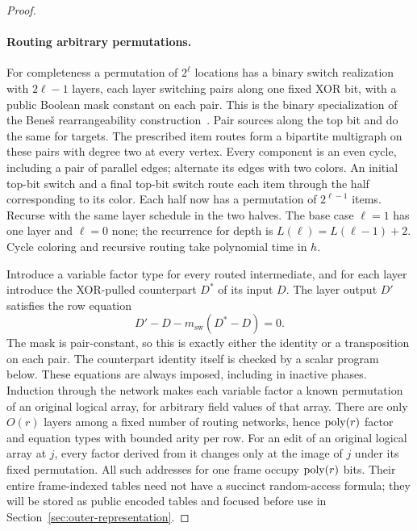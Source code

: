 \begin{proof}
\paragraph{Routing arbitrary permutations.}
For completeness a permutation of $2^\ell$ locations has a binary
switch realization with $2\ell-1$ layers, each layer switching pairs
along one fixed XOR bit, with a public Boolean mask constant on each
pair. This is the binary specialization of the Bene\v{s}
rearrangeability construction~\cite[Lemma~3 and Theorems~2--3]{Benes1964Permutation}.
Pair sources along the top
bit and do the same for targets.  The prescribed item routes form a
bipartite multigraph on these pairs with degree two at every vertex.
Every component is an even cycle, including a pair of parallel edges;
alternate its edges with two colors.  An initial top-bit switch and
a final top-bit switch route each item through the half corresponding
to its color.  Each half now has a permutation of $2^{\ell-1}$ items.
Recurse with the same layer schedule in the two halves.  The base case
$\ell=1$ has one layer and $\ell=0$ none; the recurrence for depth is
$L(\ell)=L(\ell-1)+2$.  Cycle coloring and recursive routing take
polynomial time in $h$.

Introduce a variable factor type for every routed intermediate, and
for each layer introduce the XOR-pulled counterpart $D^*$ of its input
$D$.  The layer output $D'$ satisfies the row equation
\begin{equation}\label{op:switch-row}
                      D'-D-m_{\mathrm{sw}}(D^*-D)=0.
\end{equation}
The mask is pair-constant, so this is exactly either the identity or
a transposition on each pair.  The counterpart identity itself is
checked by a scalar program below.  These equations are always
imposed, including in inactive phases.  Induction through the network
makes each variable factor a known permutation of an original logical
array, for arbitrary field values of that array.
There are only $O(r)$ layers among a fixed number of routing networks,
hence $\operatorname{poly}(r)$ factor and equation types with bounded arity per row.
For an edit of an original logical array at $j$, every factor derived
from it changes only at the image of $j$ under its fixed permutation.
All such addresses for one frame occupy $\operatorname{poly}(r)$ bits.
Their entire frame-indexed tables need not have a succinct random-access
formula; they will be stored as public encoded tables and focused
before use in Section~\ref{sec:outer-representation}.


\end{proof}
